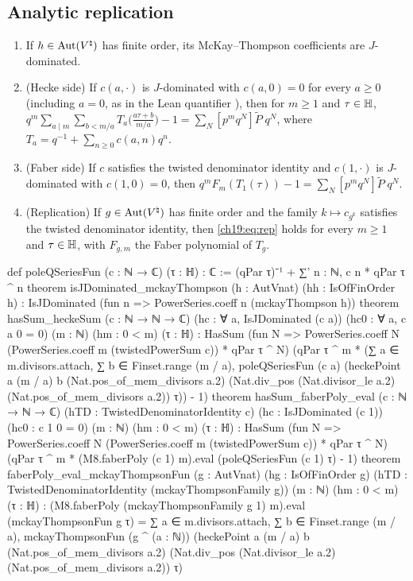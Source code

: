 \subsection{Analytic replication}

\begin{theorem}\label{ch19:thm:repanalytic}
\begin{enumerate}[label=(\alph*)]
\item If $h\in\operatorname{Aut}({V^{\natural}})$ has finite order, its McKay--Thompson coefficients are $J$-dominated.
\item (Hecke side) If $c(a,\cdot)$ is $J$-dominated with $c(a,0)=0$ for every $a\ge0$ (including $a=0$, as in the Lean
  quantifier ), then for $m\ge1$ and $\tau\in\mathbb{H}$,
  $q^m\sum_{a\mid m}\sum_{b<m/a}T_a\bigl(\frac{a\tau+b}{m/a}\bigr)-1=\sum_N[p^mq^N]\tilde P\;q^N$, where
  $T_a=q^{-1}+\sum_{n\ge0}c(a,n)q^n$.
\item (Faber side) If $c$ satisfies the twisted denominator identity and $c(1,\cdot)$ is $J$-dominated with $c(1,0)=0$,
  then $q^mF_m(T_1(\tau))-1=\sum_N[p^mq^N]\tilde P\;q^N$.
\item (Replication) If $g\in\operatorname{Aut}({V^{\natural}})$ has finite order and the family $k\mapsto c_{g^k}$ satisfies the twisted denominator
  identity, then \eqref{ch19:eq:rep} holds for every $m\ge1$ and $\tau\in\mathbb{H}$, with $F_{g,m}$ the Faber polynomial of
  $T_g$.
\end{enumerate}
\end{theorem}
\begin{leancode}
def poleQSeriesFun (c : ℕ → ℂ) (τ : ℍ) : ℂ :=
  (qPar τ)⁻¹ + ∑' n : ℕ, c n * qPar τ ^ n
theorem isJDominated_mckayThompson (h : AutVnat) (hh : IsOfFinOrder h) :
    IsJDominated (fun n => PowerSeries.coeff n (mckayThompson h))
theorem hasSum_heckeSum (c : ℕ → ℕ → ℂ) (hc : ∀ a, IsJDominated (c a)) (hc0 : ∀ a, c a 0 = 0)
    (m : ℕ) (hm : 0 < m) (τ : ℍ) :
    HasSum (fun N => PowerSeries.coeff N (PowerSeries.coeff m (twistedPowerSum c)) * qPar τ ^ N)
      (qPar τ ^ m * (∑ a ∈ m.divisors.attach, ∑ b ∈ Finset.range (m / a),
        poleQSeriesFun (c a) (heckePoint a (m / a) b (Nat.pos_of_mem_divisors a.2)
          (Nat.div_pos (Nat.divisor_le a.2) (Nat.pos_of_mem_divisors a.2)) τ)) - 1)
theorem hasSum_faberPoly_eval (c : ℕ → ℕ → ℂ) (hTD : TwistedDenominatorIdentity c)
    (hc : IsJDominated (c 1)) (hc0 : c 1 0 = 0) (m : ℕ) (hm : 0 < m) (τ : ℍ) :
    HasSum (fun N => PowerSeries.coeff N (PowerSeries.coeff m (twistedPowerSum c)) * qPar τ ^ N)
      (qPar τ ^ m * (M8.faberPoly (c 1) m).eval (poleQSeriesFun (c 1) τ) - 1)
theorem faberPoly_eval_mckayThompsonFun (g : AutVnat) (hg : IsOfFinOrder g)
    (hTD : TwistedDenominatorIdentity (mckayThompsonFamily g)) (m : ℕ) (hm : 0 < m) (τ : ℍ) :
    (M8.faberPoly (mckayThompsonFamily g 1) m).eval (mckayThompsonFun g τ) =
      ∑ a ∈ m.divisors.attach, ∑ b ∈ Finset.range (m / a),
        mckayThompsonFun (g ^ (a : ℕ)) (heckePoint a (m / a) b (Nat.pos_of_mem_divisors a.2)
          (Nat.div_pos (Nat.divisor_le a.2) (Nat.pos_of_mem_divisors a.2)) τ)
\end{leancode}
